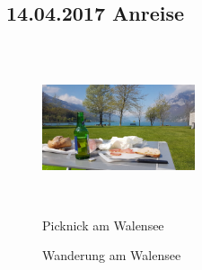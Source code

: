 \subsection{14.04.2017 Anreise}
\begin{figure} 
  \begin{centering}
    \includegraphics[width=0.4\textwidth, height=5cm, keepaspectratio]{../Bilder/Walensee/7.jpg}
    \caption{Picknick am Walensee}
  \end{centering}
\end{figure} 

\begin{figure}[b]
\centering
   \quad
   \quad
   \quad
   \caption[Wanderung am Walensee]{Wanderung am Walensee}
\end{figure}

